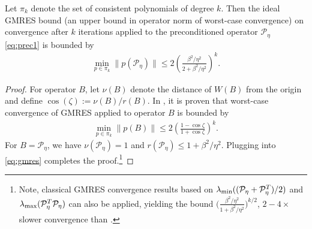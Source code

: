 \documentclass[review]{siamart}
\begin{document}
%
\begin{corollary}\label{cor:gmres}
Let $\pi_k$ denote the set of consistent polynomials of degree $k$. Then the ideal GMRES bound
(an upper bound in operator norm of worst-case convergence) on convergence after $k$ iterations
applied to the preconditioned operator $\mathcal{P}_\eta$ \eqref{eq:prec1} is bounded by
\begin{align*}
\min_{p\in\pi_k} \|p(\mathcal{P}_\eta)\| \leq 2\left(\frac{\beta^2/\eta^2}{2 + \beta^2/\eta^2}\right)^k.
\end{align*}
\end{corollary}
\begin{proof}
For operator $B$, let $\nu(B)$ denote the distance of $W(B)$ from the origin and define
$\cos(\zeta) := \nu(B) / r(B)$. In \cite[Lemma 3.2]{liesen2012field}, it is proven that worst-case convergence of GMRES applied to operator $B$ is bounded by
%
\begin{align}\label{eq:gmres}
\min_{p\in\pi_k} \|p(B)\| \leq 2\left(\frac{1-\cos\zeta}{1+\cos\zeta}\right)^k.
\end{align}
%
For $B = \mathcal{P}_\eta$, we have $\nu(\mathcal{P}_\eta)= 1$ and $r(\mathcal{P}_\eta) \leq 1+\beta^2/\eta^2$.
Plugging into \eqref{eq:gmres} completes the proof.\footnote{Note, classical GMRES convergence
results based on $\lambda_{\textnormal{min}}((\mathcal{P}_\eta+\mathcal{P}_\eta^T)/2)$ and
$\lambda_{\textnormal{max}}(\mathcal{P}_\eta^T\mathcal{P}_\eta)$ can also be applied, yielding
the bound $\Big(\tfrac{\beta^2/\eta^2}{1 + \beta^2/\eta^2}\Big)^{k/2}$, $2-4\times$
slower convergence than .}
\end{proof}
%
\end{document}
